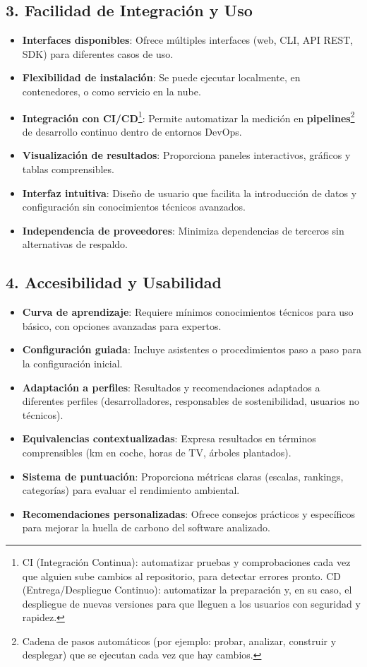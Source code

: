 \documentclass[12pt,a4paper]{report}
\begin{document}
\subsection*{3. Facilidad de Integración y Uso}
\begin{itemize}
  \item \textbf{Interfaces disponibles}: Ofrece múltiples interfaces (web, CLI, API REST, SDK) para diferentes casos de uso.
  \item \textbf{Flexibilidad de instalación}: Se puede ejecutar localmente, en contenedores, o como servicio en la nube.
  \item \textbf{Integración con CI/CD}\footnote{CI (Integración Continua): automatizar pruebas y comprobaciones cada vez que alguien sube cambios al repositorio, para detectar errores pronto. CD (Entrega/Despliegue Continuo): automatizar la preparación y, en su caso, el despliegue de nuevas versiones para que lleguen a los usuarios con seguridad y rapidez.}: Permite automatizar la medición en \textbf{pipelines}\footnote{Cadena de pasos automáticos (por ejemplo: probar, analizar, construir y desplegar) que se ejecutan cada vez que hay cambios.} de desarrollo continuo dentro de entornos DevOps.
  \item \textbf{Visualización de resultados}: Proporciona paneles interactivos, gráficos y tablas comprensibles.
  \item \textbf{Interfaz intuitiva}: Diseño de usuario que facilita la introducción de datos y configuración sin conocimientos técnicos avanzados.
  \item \textbf{Independencia de proveedores}: Minimiza dependencias de terceros sin alternativas de respaldo.
\end{itemize}

\subsection*{4. Accesibilidad y Usabilidad}
\begin{itemize}
  \item \textbf{Curva de aprendizaje}: Requiere mínimos conocimientos técnicos para uso básico, con opciones avanzadas para expertos.
  \item \textbf{Configuración guiada}: Incluye asistentes o procedimientos paso a paso para la configuración inicial.
  \item \textbf{Adaptación a perfiles}: Resultados y recomendaciones adaptados a diferentes perfiles (desarrolladores, responsables de sostenibilidad, usuarios no técnicos).
  \item \textbf{Equivalencias contextualizadas}: Expresa resultados en términos comprensibles (km en coche, horas de TV, árboles plantados).
  \item \textbf{Sistema de puntuación}: Proporciona métricas claras (escalas, rankings, categorías) para evaluar el rendimiento ambiental.
  \item \textbf{Recomendaciones personalizadas}: Ofrece consejos prácticos y específicos para mejorar la huella de carbono del software analizado.
\end{itemize}
\end{document}
